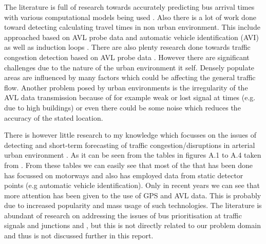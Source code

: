 The literature is full of research towards accurately predicting bus arrival times with various computational models being used \cite{altinkaya2013urban}. Also there is a lot of work done toward detecting calculating travel times in non urban environment. This include approached based on AVL probe data and automatic vehicle identification (AVI) as well as induction loops \cite{Vlahogianni20143}. There are also plenty research done towards traffic congestion detection based on AVL probe data \cite{Vlahogianni20143}. However there are significant challenges due to the nature of the urban environment it self. Densely populate areas are influenced by many factors which could be affecting the general traffic flow. Another problem posed by urban environments is the irregularity of the AVL data transmission because of for example weak or lost signal at times (e.g. due to high buildings) or even there could be some noise which reduces the accuracy of the stated location. 

There is however little research to my knowledge which focusses on the issues of detecting and short-term forecasting of traffic congestion/disruptions in arterial urban environment  \cite{Vlahogianni20143} \cite{5625144}. As it can be seen from the tables in figures A.1 to A.4 taken from \cite{Vlahogianni20143}. From these tables we can easily see that most of the that has been done has focussed on motorways and also has employed data from static detector points (e.g automatic vehicle identification). Only in recent years we can see that more attention has been given to the use of GPS and AVL data. This is probably due to increased popularity and mass usage of such technologies. The literature is abundant of research on addressing the issues of bus prioritisation at traffic signals and junctions \cite{eps52676} and \cite{clarke2007}, but this is not directly related to our problem domain and thus is not discussed further in this report.


